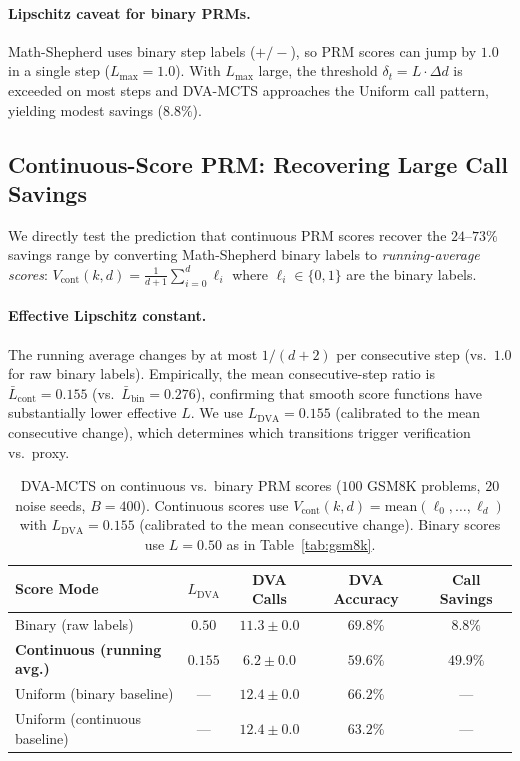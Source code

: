 \paragraph{Lipschitz caveat for binary PRMs.}
Math-Shepherd uses binary step labels ($+/-$), so PRM scores can jump by $1.0$ in
a single step ($L_{\max}{=}1.0$). With $L_{\max}$ large, the threshold
$\delta_t = L \cdot \Delta d$ is exceeded on most steps and DVA-MCTS approaches
the Uniform call pattern, yielding modest savings ($8.8\%$).

\subsection{Continuous-Score PRM: Recovering Large Call Savings}
\label{sec:gsm8k_continuous}

We directly test the prediction that continuous PRM scores recover the
$24$--$73\%$ savings range by converting Math-Shepherd binary labels to
\emph{running-average scores}: $V_{\text{cont}}(k,d) = \frac{1}{d+1}\sum_{i=0}^{d}\ell_i$
where $\ell_i \in \{0,1\}$ are the binary labels.

\paragraph{Effective Lipschitz constant.}
The running average changes by at most $1/(d+2)$ per consecutive step (vs.\ $1.0$
for raw binary labels). Empirically, the mean consecutive-step ratio is
$\bar{L}_{\text{cont}}{=}0.155$ (vs.\ $\bar{L}_{\text{bin}}{=}0.276$), confirming
that smooth score functions have substantially lower effective $L$.  We use
$L_{\text{DVA}}{=}0.155$ (calibrated to the mean consecutive change), which
determines which transitions trigger verification vs.\ proxy.

\begin{table}[t]
\centering
\caption{DVA-MCTS on continuous vs.\ binary PRM scores ($100$ GSM8K problems,
         $20$ noise seeds, $B{=}400$).  Continuous scores use
         $V_{\text{cont}}(k,d)=\text{mean}(\ell_0,\ldots,\ell_d)$ with
         $L_{\text{DVA}}{=}0.155$ (calibrated to the mean consecutive change).
         Binary scores use $L{=}0.50$ as in Table~\ref{tab:gsm8k}.}
\label{tab:gsm8k_continuous}
\begin{tabular}{lcccc}
\toprule
Score Mode & $L_{\text{DVA}}$ & DVA Calls & DVA Accuracy & Call Savings \\
\midrule
Binary (raw labels)           & $0.50$ & $11.3 \pm 0.0$ & $69.8\%$ & $8.8\%$ \\
\textbf{Continuous (running avg.)} & $\mathbf{0.155}$ & $\mathbf{6.2} \pm 0.0$ & $59.6\%$ & $\mathbf{49.9\%}$ \\
\midrule
Uniform (binary baseline)     & ---    & $12.4 \pm 0.0$ & $66.2\%$ & --- \\
Uniform (continuous baseline) & ---    & $12.4 \pm 0.0$ & $63.2\%$ & --- \\
\bottomrule
\end{tabular}
\end{table}


